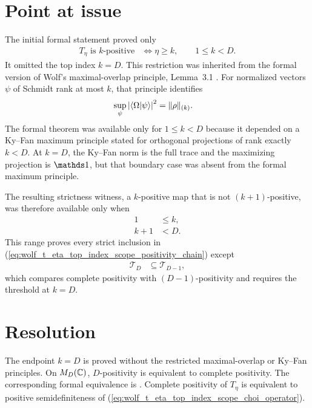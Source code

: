 \documentclass{article}
\begin{document}
\section{Point at issue}

The initial formal statement proved only
\begin{align}
  T_\eta\text{ is $k$-positive}
    &\Longleftrightarrow \eta\geq k,
  \qquad 1\leq k<D.
  \label{eq:wolf_t_eta_top_index_scope_initial_formal_threshold}
\end{align}
It omitted the top index $k=D$. This restriction was inherited from the formal
version of Wolf's maximal-overlap principle, Lemma~3.1
\cite[Lemma~3.1]{Wolf2012Quantum}. For normalized vectors $\psi$ of Schmidt
rank at most $k$, that principle identifies
\begin{align}
  \sup_\psi\left|\langle \Omega | \psi \rangle\right|^2
    &=\|\rho\|_{(k)}.
  \label{eq:wolf_t_eta_top_index_scope_maximal_overlap}
\end{align}
The formal theorem was available only for $1\leq k<D$ because it depended on a
Ky--Fan maximum principle stated for orthogonal projections of rank exactly
$k<D$. At $k=D$, the Ky--Fan norm is the full trace and the maximizing
projection is $\Id$, but that boundary case was absent from the formal maximum
principle.

The resulting strictness witness, a $k$-positive map that is not
$(k+1)$-positive, was therefore available only when
\begin{align}
  1
    &\leq k,
  \label{eq:wolf_t_eta_top_index_scope_initial_witness_lower_bound}\\
  k+1
    &<D.
  \label{eq:wolf_t_eta_top_index_scope_initial_witness_upper_bound}
\end{align}
This range proves every strict inclusion in
(\ref{eq:wolf_t_eta_top_index_scope_positivity_chain}) except
\begin{align}
  \mathcal T_D
    &\subseteq\mathcal T_{D-1},
  \label{eq:wolf_t_eta_top_index_scope_top_inclusion}
\end{align}
which compares complete positivity with $(D-1)$-positivity and requires the
threshold at $k=D$.

\section{Resolution}

The endpoint $k=D$ is proved without the restricted maximal-overlap or Ky--Fan
principles. On $M_{D}(\mathbb{C})$, $D$-positivity is equivalent to complete positivity.
The corresponding formal equivalence is
. Complete positivity of $T_\eta$ is
equivalent to positive semidefiniteness of
(\ref{eq:wolf_t_eta_top_index_scope_choi_operator}).
\end{document}
